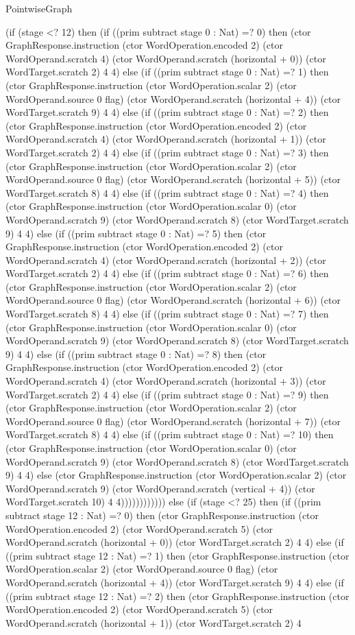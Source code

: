 \begin{lexlean}{PointwiseGraph}
\begin{semanticmodule}
{      (if (stage <? 12) then (if ((prim subtract stage 0 : Nat) =? 0) then (ctor GraphResponse.instruction (ctor WordOperation.encoded 2) (ctor WordOperand.scratch 4) (ctor WordOperand.scratch (horizontal + 0)) (ctor WordTarget.scratch 2) 4 4) else (if ((prim subtract stage 0 : Nat) =? 1) then (ctor GraphResponse.instruction (ctor WordOperation.scalar 2) (ctor WordOperand.source 0 flag) (ctor WordOperand.scratch (horizontal + 4)) (ctor WordTarget.scratch 9) 4 4) else (if ((prim subtract stage 0 : Nat) =? 2) then (ctor GraphResponse.instruction (ctor WordOperation.encoded 2) (ctor WordOperand.scratch 4) (ctor WordOperand.scratch (horizontal + 1)) (ctor WordTarget.scratch 2) 4 4) else (if ((prim subtract stage 0 : Nat) =? 3) then (ctor GraphResponse.instruction (ctor WordOperation.scalar 2) (ctor WordOperand.source 0 flag) (ctor WordOperand.scratch (horizontal + 5)) (ctor WordTarget.scratch 8) 4 4) else (if ((prim subtract stage 0 : Nat) =? 4) then (ctor GraphResponse.instruction (ctor WordOperation.scalar 0) (ctor WordOperand.scratch 9) (ctor WordOperand.scratch 8) (ctor WordTarget.scratch 9) 4 4) else (if ((prim subtract stage 0 : Nat) =? 5) then (ctor GraphResponse.instruction (ctor WordOperation.encoded 2) (ctor WordOperand.scratch 4) (ctor WordOperand.scratch (horizontal + 2)) (ctor WordTarget.scratch 2) 4 4) else (if ((prim subtract stage 0 : Nat) =? 6) then (ctor GraphResponse.instruction (ctor WordOperation.scalar 2) (ctor WordOperand.source 0 flag) (ctor WordOperand.scratch (horizontal + 6)) (ctor WordTarget.scratch 8) 4 4) else (if ((prim subtract stage 0 : Nat) =? 7) then (ctor GraphResponse.instruction (ctor WordOperation.scalar 0) (ctor WordOperand.scratch 9) (ctor WordOperand.scratch 8) (ctor WordTarget.scratch 9) 4 4) else (if ((prim subtract stage 0 : Nat) =? 8) then (ctor GraphResponse.instruction (ctor WordOperation.encoded 2) (ctor WordOperand.scratch 4) (ctor WordOperand.scratch (horizontal + 3)) (ctor WordTarget.scratch 2) 4 4) else (if ((prim subtract stage 0 : Nat) =? 9) then (ctor GraphResponse.instruction (ctor WordOperation.scalar 2) (ctor WordOperand.source 0 flag) (ctor WordOperand.scratch (horizontal + 7)) (ctor WordTarget.scratch 8) 4 4) else (if ((prim subtract stage 0 : Nat) =? 10) then (ctor GraphResponse.instruction (ctor WordOperation.scalar 0) (ctor WordOperand.scratch 9) (ctor WordOperand.scratch 8) (ctor WordTarget.scratch 9) 4 4) else (ctor GraphResponse.instruction (ctor WordOperation.scalar 2) (ctor WordOperand.scratch 9) (ctor WordOperand.scratch (vertical + 4)) (ctor WordTarget.scratch 10) 4 4)))))))))))) else (if (stage <? 25) then (if ((prim subtract stage 12 : Nat) =? 0) then (ctor GraphResponse.instruction (ctor WordOperation.encoded 2) (ctor WordOperand.scratch 5) (ctor WordOperand.scratch (horizontal + 0)) (ctor WordTarget.scratch 2) 4 4) else (if ((prim subtract stage 12 : Nat) =? 1) then (ctor GraphResponse.instruction (ctor WordOperation.scalar 2) (ctor WordOperand.source 0 flag) (ctor WordOperand.scratch (horizontal + 4)) (ctor WordTarget.scratch 9) 4 4) else (if ((prim subtract stage 12 : Nat) =? 2) then (ctor GraphResponse.instruction (ctor WordOperation.encoded 2) (ctor WordOperand.scratch 5) (ctor WordOperand.scratch (horizontal + 1)) (ctor WordTarget.scratch 2) 4 }
\end{semanticmodule}
\end{lexlean}
